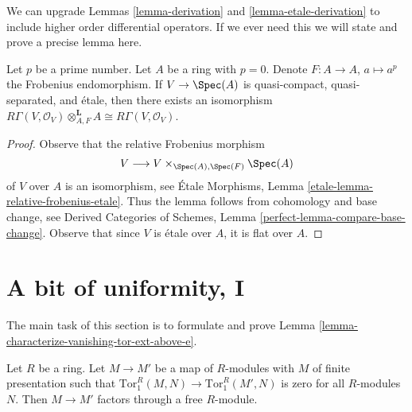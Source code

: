 \begin{remark}
\label{remark-higher-order-operators}
We can upgrade Lemmas \ref{lemma-derivation} and \ref{lemma-etale-derivation}
to include higher order differential operators.
If we ever need this we will state and prove a
precise lemma here.
\end{remark}

\begin{lemma}
\label{lemma-etale-frobenius}
Let $p$ be a prime number. Let $A$ be a ring with $p = 0$.
Denote $F : A \to A$, $a \mapsto a^p$ the Frobenius endomorphism.
If $V \to \Spec(A)$ is quasi-compact, quasi-separated,
and \'etale, then there exists an isomorphism
$R\Gamma(V, \mathcal{O}_V) \otimes_{A, F}^\mathbf{L} A \cong
R\Gamma(V, \mathcal{O}_V)$.
\end{lemma}

\begin{proof}
Observe that the relative Frobenius morphism
$$
V \longrightarrow V \times_{\Spec(A), \Spec(F)} \Spec(A)
$$
of $V$ over $A$ is an isomorphism, see
\'Etale Morphisms, Lemma \ref{etale-lemma-relative-frobenius-etale}.
Thus the lemma follows from cohomology and base change, see
Derived Categories of Schemes, Lemma
\ref{perfect-lemma-compare-base-change}.
Observe that since $V$ is \'etale over $A$, it is flat over $A$.
\end{proof}





\section{A bit of uniformity, I}
\label{section-uniform-vanishing}

\noindent
The main task of this section is to formulate and prove
Lemma \ref{lemma-characterize-vanishing-tor-ext-above-e}.

\begin{lemma}
\label{lemma-map-tor-1-zero}
Let $R$ be a ring. Let $M \to M'$ be a map of $R$-modules with
$M$ of finite presentation
such that $\text{Tor}_1^R(M, N) \to \text{Tor}_1^R(M', N)$ is zero for all
$R$-modules $N$. Then $M \to M'$ factors through a free $R$-module.
\end{lemma}

